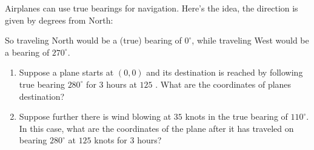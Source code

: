 \documentclass{ximera}
\begin{document}
\begin{example}[Navigation]
  Airplanes can use true bearings for navigation. Here's the idea, the direction is given by degrees from North:

\begin{center}
\upshape
\def\radius{2cm}
\def\onedegrad{1.8cm}
\def\fivedegrad{1.75cm}
\def\tendegrad{1.7cm}
\def\labelrad{1.6cm}

\end{center}

So traveling North would be a (true) bearing of $0^\circ$, while
traveling West would be a bearing of $270^\circ$.
\begin{enumerate}
\item Suppose a plane starts at $(0,0)$ and its destination is reached
  by following true bearing $280^\circ$ for $3$ hours at $125$ .
  What are the coordinates of planes destination?
\item Suppose further there is wind blowing at $35$ knots in the true
  bearing of $110^\circ$. In this case, what are the coordinates of
  the plane after it has traveled on bearing $280^\circ$ at $125$
  knots for $3$ hours?
\end{enumerate}


\end{example}
\end{document}

